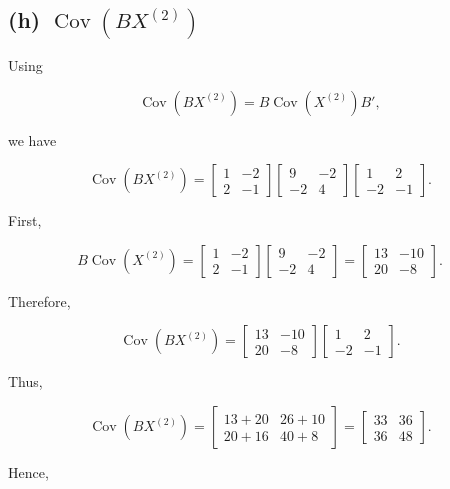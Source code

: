 \documentclass[12pt]{article}
\begin{document}
\subsection*{(h) $\operatorname{Cov}(BX^{(2)})$}

Using

\[
\operatorname{Cov}(BX^{(2)})
=
B\operatorname{Cov}(X^{(2)})B',
\]

we have

\[
\operatorname{Cov}(BX^{(2)})
=
\begin{bmatrix}
1&-2\\
2&-1
\end{bmatrix}
\begin{bmatrix}
9&-2\\
-2&4
\end{bmatrix}
\begin{bmatrix}
1&2\\
-2&-1
\end{bmatrix}.
\]

First,

\[
B\operatorname{Cov}(X^{(2)})
=
\begin{bmatrix}
1&-2\\
2&-1
\end{bmatrix}
\begin{bmatrix}
9&-2\\
-2&4
\end{bmatrix}
=
\begin{bmatrix}
13&-10\\
20&-8
\end{bmatrix}.
\]

Therefore,

\[
\operatorname{Cov}(BX^{(2)})
=
\begin{bmatrix}
13&-10\\
20&-8
\end{bmatrix}
\begin{bmatrix}
1&2\\
-2&-1
\end{bmatrix}.
\]

Thus,

\[
\operatorname{Cov}(BX^{(2)})
=
\begin{bmatrix}
13+20&26+10\\
20+16&40+8
\end{bmatrix}
=
\begin{bmatrix}
33&36\\
36&48
\end{bmatrix}.
\]

Hence,
\end{document}
